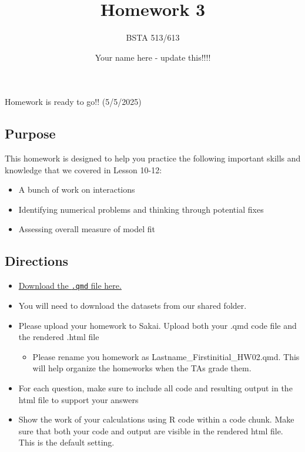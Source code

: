 \documentclass[
  letterpaper,
  DIV=11,
  numbers=noendperiod]{scrartcl}
\title{Homework 3}
\subtitle{BSTA 513/613}
\author{Your name here - update this!!!!}
\date{}
\providecommand{\tightlist}{%
  \setlength{\itemsep}{0pt}\setlength{\parskip}{0pt}}\usepackage{longtable,booktabs,array}
\begin{document}
\maketitle


\begin{tcolorbox}[enhanced jigsaw, left=2mm, colback=white, opacityback=0, bottomrule=.15mm, colframe=quarto-callout-caution-color-frame, rightrule=.15mm, breakable, coltitle=black, arc=.35mm, toptitle=1mm, bottomtitle=1mm, opacitybacktitle=0.6, leftrule=.75mm, titlerule=0mm, toprule=.15mm, colbacktitle=quarto-callout-caution-color!10!white, title=\textcolor{quarto-callout-caution-color}{\faFire}\hspace{0.5em}{Caution}]

Homework is ready to go!! (5/5/2025)

\end{tcolorbox}

\subsection{Purpose}\label{purpose}

This homework is designed to help you practice the following important
skills and knowledge that we covered in Lesson 10-12:

\begin{itemize}
\tightlist
\item
  A bunch of work on interactions
\item
  Identifying numerical problems and thinking through potential fixes
\item
  Assessing overall measure of model fit
\end{itemize}

\subsection{Directions}\label{directions}

\begin{itemize}
\item
  \href{https://github.com/nwakim/BSTA_513_S25/blob/main/homework/HW_03.qmd}{Download
  the \texttt{.qmd} file here.}
\item
  You will need to download the datasets from our shared folder.
\item
  Please upload your homework to Sakai. Upload both your .qmd code file
  and the rendered .html file

  \begin{itemize}
  \tightlist
  \item
    Please rename you homework as Lastname\_Firstinitial\_HW02.qmd. This
    will help organize the homeworks when the TAs grade them.
  \end{itemize}
\item
  For each question, make sure to include all code and resulting output
  in the html file to support your answers
\item
  Show the work of your calculations using R code within a code chunk.
  Make sure that both your code and output are visible in the rendered
  html file. This is the default setting.
\end{itemize}
\end{document}
